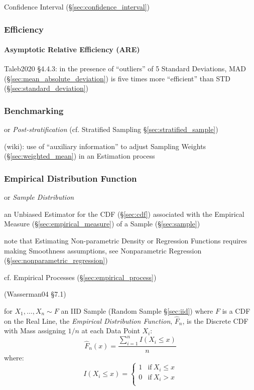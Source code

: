 \fist Confidence Interval (\S\ref{sec:confidence_interval})



\subsubsection{Efficiency}\label{sec:efficiency}

\paragraph{Asymptotic Relative Efficiency (ARE)}\label{sec:are}\hfill

Taleb2020 \S 4.4.3: in the presence of ``outliers'' of 5 Standard Deviations,
MAD (\S\ref{sec:mean_absolute_deviation}) is five times more ``efficient'' than
STD (\S\ref{sec:standard_deviation})



\subsubsection{Benchmarking}\label{sec:benchmarking}

or \emph{Post-stratification} (cf. Stratified Sampling
\S\ref{sec:stratified_sample})

(wiki): use of ``auxiliary information'' to adjust Sampling Weights
(\S\ref{sec:weighted_mean}) in an Estimation process



\subsubsection{Empirical Distribution Function}
\label{sec:empirical_distribution}

or \emph{Sample Distribution}

an Unbiased Estimator for the CDF (\S\ref{sec:cdf}) associated with the
Empirical Measure (\S\ref{sec:empirical_measure}) of a Sample
(\S\ref{sec:sample})

note that Estimating Non-parametric Density or Regression Functions requires
making Smoothness assumptions, see Nonparametric Regression
(\S\ref{sec:nonparametric_regression})

\fist cf. Empirical Processes (\S\ref{sec:empirical_process})

(Wasserman04 \S7.1)

for $X_1, \ldots, X_n \sim F$ an IID Sample (Random Sample \S\ref{sec:iid})
where $F$ is a CDF on the Real Line, the \emph{Empirical Distribution Function},
$\hat{F}_n$, is the Discrete CDF with Mass assigning $1/n$ at each Data Point
$X_i$:
\[
  \hat{F}_n(x) = \frac{\sum_{i=1}^n I(X_i \leq x)}{n}
\]
where:
\[
  I(X_i \leq x) = \begin{cases}
    1 & \text{if}\ X_i \leq x \\
    0 & \text{if}\ X_i > x \\
  \end{cases}
\]

